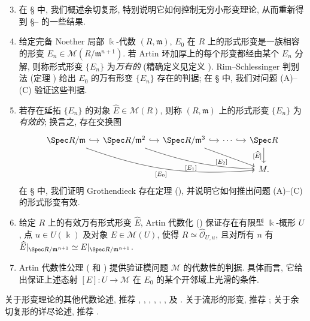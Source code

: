 \begin{enumerate}[(1)]\setcounter{enumi}{2}
\item 在 \S{} 中, 我们概述余切复形, 特别说明它如何控制无穷小形变理论, 从而重新得到 \S{}-- 的一些结果.
\item 给定完备 Noether 局部 $\Bbbk$-代数 $(R,\mathfrak m)$, $E_0$ 在 $R$ 上的形式形变是一族相容的形变 $E_n\in\mathcal M(R/\mathfrak m^{n+1})$. 若 Artin 环加厚上的每个形变都经由某个 $E_n$ 分解, 则称形式形变 $\{E_n\}$ 为\textit{万有的} (精确定义见定义 ). Rim--Schlessinger 判别法 (定理 ) 给出 $E_0$ 的万有形变 $\{E_n\}$ 存在的判据; 在 \S{} 中, 我们对问题 (A)--(C) 验证这些判据.
\item 若存在延拓 $\{E_n\}$ 的对象 $\widehat E\in\mathcal M(R)$, 则称 $(R,\mathfrak m)$ 上的形式形变 $\{E_n\}$ 为\textit{有效的}; 换言之, 存在交换图
\[
\begin{tikzcd}[column sep=small]
\Spec R/\mathfrak m\arrow[r,hook]\arrow[drrrr,"{[E_0]}"',bend right=12]&\Spec R/\mathfrak m^2\arrow[r,hook]\arrow[drrr,"{[E_1]}"',bend right=8]&\Spec R/\mathfrak m^3\arrow[r,hook]\arrow[drr,"{[E_2]}"']&\cdots\arrow[r,hook]&\Spec R\arrow[d,"{[\widehat E]}"']\\
&&&&\mathcal M.
\end{tikzcd}
\]
在 \S{} 中, 我们证明 Grothendieck 存在定理 (), 并说明它如何推出问题 (A)--(C) 的形式形变有效.
\item 给定 $R$ 上的有效万有形式形变 $\widehat E$, Artin 代数化 () 保证存在有限型 $\Bbbk$-概形 $U$, 点 $u\in U(\Bbbk)$ 及对象 $E\in\mathcal M(U)$, 使得 $R\simeq\widehat{\mathcal O}_{U,u}$, 且对所有 $n$ 有 $\widehat E|_{\Spec R/\mathfrak m^{n+1}}\simeq E|_{\Spec R/\mathfrak m^{n+1}}$.
\item Artin 代数性公理 ( 和 ) 提供验证模问题 $\mathcal M$ 的代数性的判据. 具体而言, 它给出保证上述态射 $[E]:U\to\mathcal M$ 在 $E_0$ 的某个开邻域上光滑的条件.
\end{enumerate}
关于形变理论的其他代数论述, 推荐 \cite{Art76}, \cite[\S I.$2$]{Kol96}, \cite{Vis97}, \cite[\S $6$]{FGI+05}, \cite{Ser06}, \cite{Nit09}, \cite{Har10} 及 \cite[Tag 0ELW]{SP}. 关于流形的形变, 推荐 \cite{Kod86}; 关于余切复形的详尽论述, 推荐 \cite{Ill71,Ill72}.
